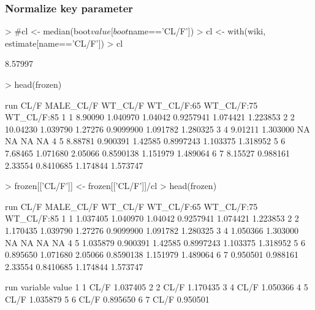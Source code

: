 \subsubsection{Normalize key parameter}
\begin{Schunk}
\begin{Sinput}
> #cl <- median(boot$value[boot$name=='CL/F'])
> cl <- with(wiki, estimate[name=='CL/F'])
> cl
\end{Sinput}
\begin{Soutput}
[1] 8.57997
\end{Soutput}
\begin{Sinput}
> head(frozen)
\end{Sinput}
\begin{Soutput}
  run     CL/F MALE_CL/F WT_CL/F WT_CL/F:65 WT_CL/F:75 WT_CL/F:85
1   1  8.90090  1.040970 1.04042  0.9257941   1.074421   1.223853
2   2 10.04230  1.039790 1.27276  0.9099900   1.091782   1.280325
3   4  9.01211  1.303000      NA         NA         NA         NA
4   5  8.88781  0.900391 1.42585  0.8997243   1.103375   1.318952
5   6  7.68465  1.071680 2.05066  0.8590138   1.151979   1.489064
6   7  8.15527  0.988161 2.33554  0.8410685   1.174844   1.573747
\end{Soutput}
\begin{Sinput}
> frozen[['CL/F']] <- frozen[['CL/F']]/cl
> head(frozen)
\end{Sinput}
\begin{Soutput}
  run     CL/F MALE_CL/F WT_CL/F WT_CL/F:65 WT_CL/F:75 WT_CL/F:85
1   1 1.037405  1.040970 1.04042  0.9257941   1.074421   1.223853
2   2 1.170435  1.039790 1.27276  0.9099900   1.091782   1.280325
3   4 1.050366  1.303000      NA         NA         NA         NA
4   5 1.035879  0.900391 1.42585  0.8997243   1.103375   1.318952
5   6 0.895650  1.071680 2.05066  0.8590138   1.151979   1.489064
6   7 0.950501  0.988161 2.33554  0.8410685   1.174844   1.573747
\end{Soutput}
\begin{Soutput}
  run variable    value
1   1     CL/F 1.037405
2   2     CL/F 1.170435
3   4     CL/F 1.050366
4   5     CL/F 1.035879
5   6     CL/F 0.895650
6   7     CL/F 0.950501
\end{Soutput}
\end{Schunk}
